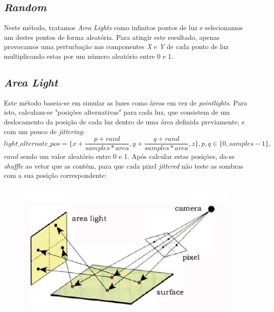 \documentclass{article}
\begin{document}
        \subsection*{\textit{Random}}
            \par
	Neste método, tratamos \textit{Area Lights} como infinitos pontos de luz e selecionamos um destes pontos de forma aleatória. Para atingir este resultado, apenas provocamos uma perturbação nas componentes \textit{X} e \textit{Y} de cada ponto de luz multiplicando estas por um número aleatório entre 0 e 1.
        \subsection*{\textit{Area Light}}
            \par
            Este método baseia-se em simular as luzes como áreas em vez de \textit{pointlights}. Para isto, calculam-se "posições alternativas" para cada luz, que consistem de um deslocamento da posição de cada luz dentro de uma área definida previamente, e com um pouco de \textit{jittering}:
            $$ light\_alternate\_pos = \{x + \frac{p + rand}{samples * area}, y + \frac{q + rand}{samples * area}, z\}, p,q \in \{0, samples - 1\},$$
            $rand$ sendo um valor aleatório entre 0 e 1. Após calcular estas posições, da-se \textit{shuffle} ao vetor que as contém, para que cada pixel \textit{jittered} não teste as sombras com a sua posição correspondente:
            \begin{figure}[h]
                \centering
                \includegraphics[scale=0.5]{area} 
            \end{figure}
\end{document}
